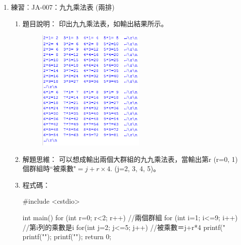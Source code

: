 \begin{enumerate}
\begin{enumerate}
\begin{cppcode}
			\end{cppcode}
		\end{enumerate}
	
	\item 練習︰JA-007：九九乘法表 (兩排)
		\begin{enumerate}
			\item 題目說明：
			\subitem 印出九九乘法表，如輸出結果所示。
			\begin{figure}[h]
				\centering
				\includegraphics[height=6cm]{fig/JA007fig}
			\end{figure}
			\item 解題思維：
			\subitem 可以想成輸出兩個大群組的九九乘法表，當輸出第r (r=0, 1) 個群組時``被乘數"$=j+r\times4.$ (j=2, 3, 4, 5)。
			
			\item 程式碼：
			\begin{cppcode}
				#include <cstdio>
				
				int main()
				{
					for (int r=0; r<2; r++) {//兩個群組
						for (int i=1; i<=9; i++) {//第i列的乘數是i
							for(int j=2; j<=5; j++) {//被乘數＝j+r*4
								printf("%
							}
							printf("\n");
						}
						printf("\n");
					}
					return 0;
				}
				
			\end{cppcode}
		\end{enumerate}
	
\end{enumerate}
